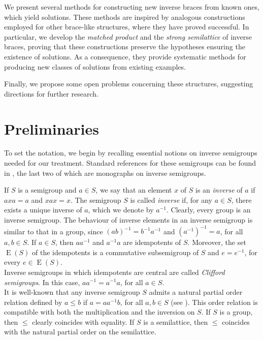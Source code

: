 \documentclass[preprint,1p]{elsarticle}
\theoremstyle{definition}               %
\DeclareMathOperator{\E}{E}
\begin{document}
We present several methods for constructing new inverse braces from known ones, which yield solutions. These methods are inspired by analogous constructions employed for other brace-like structures, where they have proved successful. In particular, we develop the \emph{matched product} and the \emph{strong semilattice} of inverse braces, proving that these constructions preserve the hypotheses ensuring the existence of solutions. As a consequence, they provide systematic methods for producing new classes of solutions from existing examples. 

Finally, we propose some open problems concerning these structures, suggesting directions for further research.





\medskip

\section{Preliminaries}
 To set the notation, we begin by recalling essential notions on inverse semigroups needed for
our treatment.  Standard references for these semigroups can be found in \cite{Ho95, La98, Law26}, the last two of which are monographs on inverse semigroups. 

If $S$ is a semigroup and $a \in S$, we say that an element $x$ of $S$ is an \emph{inverse} of $a$ if $axa=a$ and $xax=x$. The semigroup $S$ is called \emph{inverse} if, for any $a\in S$, there exists a unique inverse of $a$, which we denote by $a^{-1}$. Clearly, every group is an inverse semigroup.  The behaviour of inverse elements in an inverse semigroup is similar to that in a group, since $(ab)^{-1}=b^{-1}a^{-1}$ and $(a^{-1})^{-1}=a$, for all $a,b \in S$. If $a \in S$, then $aa^{-1}$ and $a^{-1} a$ are idempotents of $S$. Moreover, the set $\E(S)$ of the idempotents is a commutative subsemigroup of $S$ and $e=e^{-1}$, for every $e \in \E(S)$.\\
\noindent
Inverse semigroups in which idempotents are central are called \emph{Clifford semigroups}. In this case,  $aa^{-1}= a^{-1}a$, for all $a \in S$.\\
It is well-known that any inverse semigroup $S$ admits a natural partial order relation defined by $a \leq b$ if $a=aa^{-1}b$, for all $a,b \in S$ (see \cite[Section 5.2]{Ho95}). This order relation is compatible with both the multiplication and the inversion on $S$. If $S$ is a group, then $\leq$ clearly coincides with equality. If $S$ is a semilattice, then $\leq$ coincides with the natural partial order on the semilattice.
\end{document}
